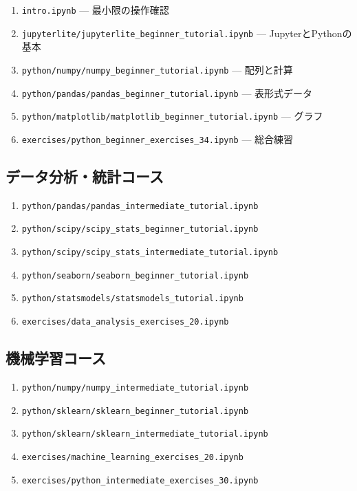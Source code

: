 \documentclass[a4paper,11pt]{ltjsarticle}
\newcommand{\filepath}[1]{\nolinkurl{#1}}
\begin{document}
\begin{enumerate}
  \item \filepath{intro.ipynb} --- 最小限の操作確認
  \item \filepath{jupyterlite/jupyterlite_beginner_tutorial.ipynb}
    --- JupyterとPythonの基本
  \item \filepath{python/numpy/numpy_beginner_tutorial.ipynb} --- 配列と計算
  \item \filepath{python/pandas/pandas_beginner_tutorial.ipynb} --- 表形式データ
  \item \filepath{python/matplotlib/matplotlib_beginner_tutorial.ipynb} --- グラフ
  \item \filepath{exercises/python_beginner_exercises_34.ipynb} --- 総合練習
\end{enumerate}

\subsection{データ分析・統計コース}

\begin{enumerate}
  \item \filepath{python/pandas/pandas_intermediate_tutorial.ipynb}
  \item \filepath{python/scipy/scipy_stats_beginner_tutorial.ipynb}
  \item \filepath{python/scipy/scipy_stats_intermediate_tutorial.ipynb}
  \item \filepath{python/seaborn/seaborn_beginner_tutorial.ipynb}
  \item \filepath{python/statsmodels/statsmodels_tutorial.ipynb}
  \item \filepath{exercises/data_analysis_exercises_20.ipynb}
\end{enumerate}

\subsection{機械学習コース}

\begin{enumerate}
  \item \filepath{python/numpy/numpy_intermediate_tutorial.ipynb}
  \item \filepath{python/sklearn/sklearn_beginner_tutorial.ipynb}
  \item \filepath{python/sklearn/sklearn_intermediate_tutorial.ipynb}
  \item \filepath{exercises/machine_learning_exercises_20.ipynb}
  \item \filepath{exercises/python_intermediate_exercises_30.ipynb}
\end{enumerate}
\end{document}
